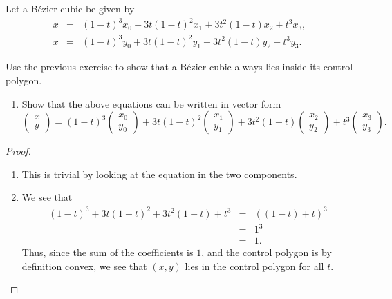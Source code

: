 \begin{exercise}{15}
    Let a B\'ezier cubic be given by
    \begin{eqnarray*}
        x & = & (1-t)^3 x_0 + 3t(1-t)^2 x_1 + 3t^2 (1-t) x_2 + t^3 x_3,\\
        x & = & (1-t)^3 y_0 + 3t(1-t)^2 y_1 + 3t^2 (1-t) y_2 + t^3 y_3.        
    \end{eqnarray*}
    \item Use the previous exercise to show that a B\'ezier cubic always lies inside its control polygon.
    \begin{enumerate}
        \item Show that the above equations can be written in vector form
        $$\left(\begin{array}{c} x\\ y\end{array}\right) = (1-t)^3 \left(\begin{array}{c} x_0\\ y_0\end{array}\right) + 3t(1-t)^2\left(\begin{array}{c} x_1\\ y_1\end{array}\right) + 3t^2 (1-t) \left(\begin{array}{c} x_2\\ y_2\end{array}\right) + t^3 \left(\begin{array}{c} x_3\\ y_3\end{array}\right).$$
    \end{enumerate}
\end{exercise}
\begin{proof}
    \begin{enumerate}
        \item This is trivial by looking at the equation in the two components. 
        \item We see that
        \begin{eqnarray*}
            (1-t)^3 + 3t(1-t)^2 + 3t^2 (1-t) + t^3
            & = & ( (1-t) + t)^3\\
            & = & 1^3\\
            & = & 1.
        \end{eqnarray*}
        Thus, since the sum of the coefficients is $1$, and the control polygon is by definition convex, we see that $(x,y)$ lies in the control polygon for all $t$.
    \end{enumerate}
\end{proof}

